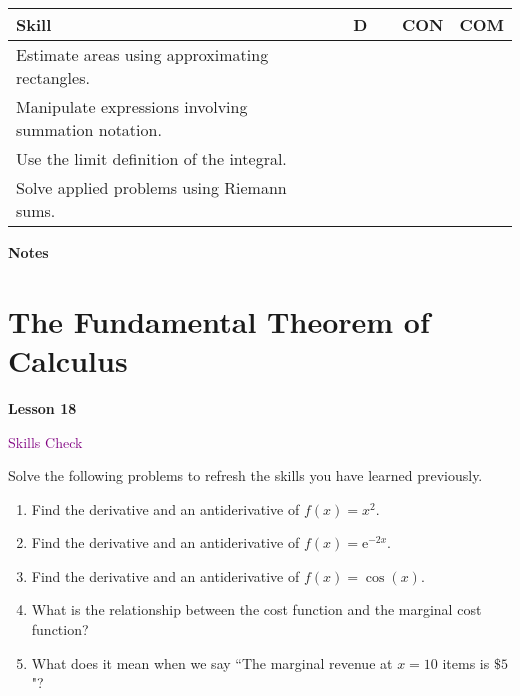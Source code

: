 \documentclass[10pt]{book}
\theoremstyle{definition}
\theoremstyle{remark}
\begin{document}
\begin{large}
\begin{center}
\begin{tabular}{|l|l|l|l|}
\hline
\textbf{Skill} & \textbf{~~D~~} & \textbf{CON} & \textbf{COM} \\
\hline
Estimate areas using approximating rectangles.&&&\\
\hline
Manipulate expressions involving summation notation.&&&\\
\hline
Use the limit definition of the integral.&&&\\
\hline
Solve applied problems using Riemann sums.&&&\\
\hline
\end{tabular}
\end{center}
\vfil

\noindent
\textbf{Notes}
\end{large} \vfil
\newpage

\section{The Fundamental Theorem of Calculus}
\begin{tcolorbox}[
  width=\textwidth,
  colback=gray!10, %
  colframe=white, %
  boxrule=0pt,    %
  left=1cm,       %
  right=1cm,      %
  sharp corners  %
]

\begin{minipage}[t]{0.5\textwidth}
  \Huge \textbf{Lesson 18}
\end{minipage}%
\hfill
\begin{minipage}[t]{0.5\textwidth}
  \Huge \textcolor{purple}{Skills Check}
\end{minipage}
\end{tcolorbox}

\begin{large}
\noindent
Solve the following problems to refresh the skills you have learned previously.
\begin{enumerate}
\item Find the derivative and an antiderivative of $f(x)=x^{2}$.\vfil \vfil \vfil
\item Find the derivative and an antiderivative of $f(x)=\textrm{e}^{-2x}$.\vfil \vfil\vfil
\item Find the derivative and an antiderivative of $f(x)=\cos(x)$.\vfil \vfil \vfil
\item What is the relationship between the cost function and the marginal cost function?\vfil \vfil \vfil
\item What does it mean when we say ``The marginal revenue at $x=10$ items is $\$5$"?\vfil \vfil \vfil
\end{enumerate}
\end{large}
\newpage
\end{document}
